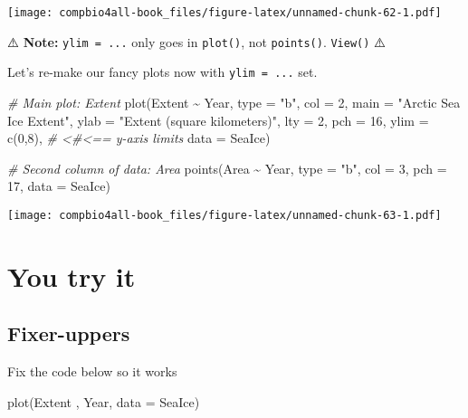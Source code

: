 \documentclass[
]{book}
\newenvironment{Shaded}{\begin{snugshade}}{\end{snugshade}}
\newcommand{\AttributeTok}[1]{\textcolor[rgb]{0.77,0.63,0.00}{#1}}
\newcommand{\CommentTok}[1]{\textcolor[rgb]{0.56,0.35,0.01}{\textit{#1}}}
\newcommand{\DecValTok}[1]{\textcolor[rgb]{0.00,0.00,0.81}{#1}}
\newcommand{\FunctionTok}[1]{\textcolor[rgb]{0.00,0.00,0.00}{#1}}
\newcommand{\NormalTok}[1]{#1}
\newcommand{\SpecialCharTok}[1]{\textcolor[rgb]{0.00,0.00,0.00}{#1}}
\newcommand{\StringTok}[1]{\textcolor[rgb]{0.31,0.60,0.02}{#1}}
\begin{document}
\texttt{[image: compbio4all-book\_files/figure-latex/unnamed-chunk-62-1.pdf]}

⚠️ \textbf{Note:} \texttt{ylim\ =\ ...} only goes in \texttt{plot()}, not \texttt{points()}. \texttt{View()} ⚠️

Let's re-make our fancy plots now with \texttt{ylim\ =\ ...} set.

\begin{Shaded}
\begin{Highlighting}[]
\CommentTok{\# Main plot: Extent}
\FunctionTok{plot}\NormalTok{(Extent }\SpecialCharTok{\textasciitilde{}}\NormalTok{ Year,  }
     \AttributeTok{type =} \StringTok{"b"}\NormalTok{,     }
     \AttributeTok{col =} \DecValTok{2}\NormalTok{,       }
     \AttributeTok{main =} \StringTok{"Arctic Sea Ice Extent"}\NormalTok{, }
     \AttributeTok{ylab =} \StringTok{"Extent (square kilometers)"}\NormalTok{,}
     \AttributeTok{lty =} \DecValTok{2}\NormalTok{,        }
     \AttributeTok{pch =} \DecValTok{16}\NormalTok{,       }
     \AttributeTok{ylim =} \FunctionTok{c}\NormalTok{(}\DecValTok{0}\NormalTok{,}\DecValTok{8}\NormalTok{), }\CommentTok{\# \textless{}\#\textless{}== y{-}axis limits}
     \AttributeTok{data =}\NormalTok{ SeaIce)  }

\CommentTok{\# Second column of data: Area}
\FunctionTok{points}\NormalTok{(Area }\SpecialCharTok{\textasciitilde{}}\NormalTok{ Year,}
       \AttributeTok{type =} \StringTok{"b"}\NormalTok{,}
       \AttributeTok{col =} \DecValTok{3}\NormalTok{,}
       \AttributeTok{pch =} \DecValTok{17}\NormalTok{,}
       \AttributeTok{data =}\NormalTok{ SeaIce)}
\end{Highlighting}
\end{Shaded}

\texttt{[image: compbio4all-book\_files/figure-latex/unnamed-chunk-63-1.pdf]}

\hypertarget{you-try-it}{%
\section{You try it}\label{you-try-it}}

\hypertarget{fixer-uppers}{%
\subsection{Fixer-uppers}\label{fixer-uppers}}

Fix the code below so it works

\begin{Shaded}
\begin{Highlighting}[]
\FunctionTok{plot}\NormalTok{(Extent , Year,  }
     \AttributeTok{data =}\NormalTok{ SeaIce)  }
\end{Highlighting}
\end{Shaded}
\end{document}
